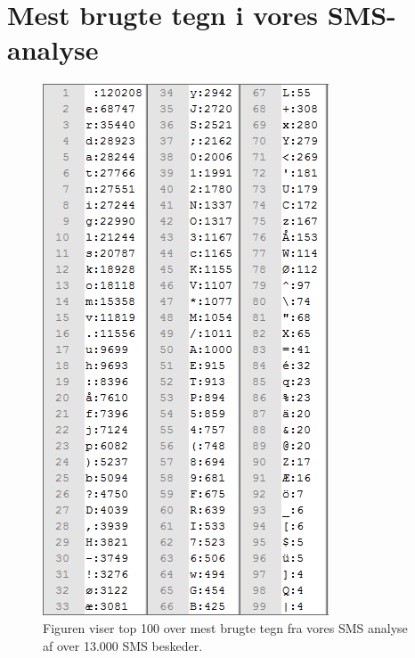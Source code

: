 \section*{Mest brugte tegn i vores SMS-analyse}
\begin{figure}[H]
\centering
\includegraphics []{Billeder/SMSbilag.png}
\caption {Figuren viser top 100 over mest brugte tegn fra vores SMS analyse af over 13.000 SMS beskeder.}
\label {SMSanalyse}
\end{figure}

